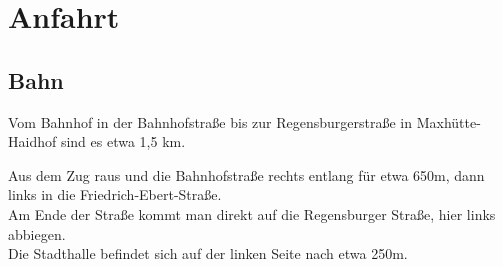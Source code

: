 \section{Anfahrt}
\subsection{Bahn}
Vom Bahnhof in der Bahnhofstraße bis zur Regensburgerstraße in Maxhütte-Haidhof sind es etwa 1,5 km.

Aus dem Zug raus und die Bahnhofstraße rechts entlang für etwa 650m, 
dann links in die Friedrich-Ebert-Straße.\\
Am Ende der Straße kommt man direkt auf die Regensburger Straße, hier links abbiegen.\\
Die Stadthalle befindet sich auf der linken Seite nach etwa 250m.
